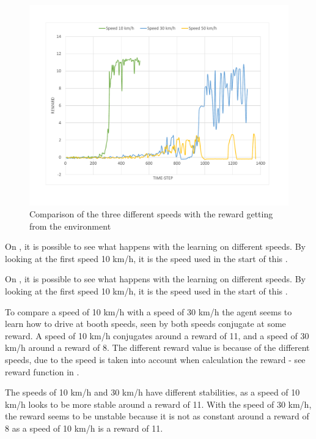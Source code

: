 \begin{figure}[H]
	\centering
	\includegraphics[width=1\textwidth]{Figures/Result/change_of_acceleration_reward_graph.pdf}
	\caption{Comparison of the three different speeds with the reward getting from the environment}
	\label{fig:change_of_acceleration_reward_graph}
\end{figure} 

On , it is possible to see what happens with the learning on different speeds. By looking at the first speed 10 km/h, it is the speed used in the start of this . 

On , it is possible to see what happens with the learning on different speeds. By looking at the first speed 10 km/h, it is the speed used in the start of this . 

To compare a speed of 10 km/h with a speed of 30 km/h the agent seems to learn how to drive at booth speeds, seen by both speeds conjugate at some reward. A speed of 10 km/h conjugates around a reward of 11, and a speed of 30 km/h around a reward of 8. The different reward value is because of the different speeds, due to the speed is taken into account when calculation the reward - see reward function in . 

The speeds of 10 km/h and 30 km/h have different stabilities, as a speed of 10 km/h looks to be more stable around a reward of 11. With the speed of 30 km/h, the reward seems to be unstable because it is not as constant around a reward of 8 as a speed of 10 km/h is a reward of 11.

